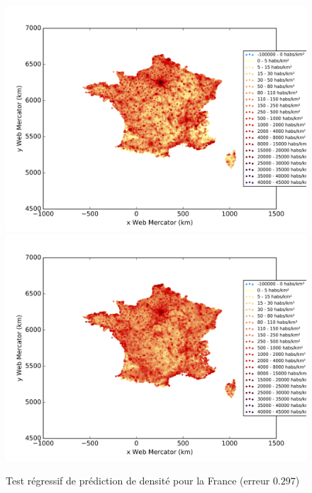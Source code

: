 \documentclass{book}
\begin{document}
\begin{figure}[H]
\begin{center}
\includegraphics[scale=0.4]{images/france_ground_truth.png}
\includegraphics[scale=0.4]{images/france_Random_Forest_Regression.png}
\end{center}
\caption{Test régressif de prédiction de densité pour la France (erreur $0.297$)}
\label{test_france}
\end{figure}
\clearpage
\end{document}
